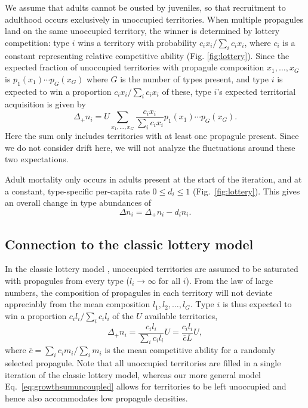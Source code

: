 \documentclass[12pt]{article}
\begin{document}
We assume that adults cannot be ousted by juveniles, so that recruitment to adulthood occurs exclusively in unoccupied territories. When multiple propagules land on the same unoccupied territory, the winner is determined by lottery competition: type $i$ wins a territory with probability $c_i x_i/\sum_i c_i x_i$, where $c_i$ is a constant representing relative competitive ability (Fig. \ref{fig:lottery}). Since the expected fraction of unoccupied territories with propagule composition $x_1,\ldots,x_G$ is $p_1(x_1)\cdots p_G(x_G)$ where $G$ is the number of types present, and type $i$ is expected to win a proportion $c_i x_i/\sum_i c_i x_i$ of these, type $i$'s expected territorial acquisition is given by
\begin{equation}
\Delta_+ n_i=U\sum_{x_1,\ldots,x_G} \frac{c_i x_i}{\sum_i c_i x_i} p_1(x_1)\cdots p_G(x_G). \label{eq:growthsumuncoupled}
\end{equation}
Here the sum only includes territories with at least one propagule present. Since we do not consider drift here, we will not analyze the fluctuations around these two expectations.

Adult mortality only occurs in adults present at the start of the  iteration, and at a constant, type-specific per-capita rate $0\leq d_i\leq 1$ (Fig.~\ref{fig:lottery}). This gives an overall change in type abundances of
\begin{equation}
\Delta n_i=\Delta_+ n_i-d_i n_i. \label{eq:delttot}
\end{equation}

\subsection*{Connection to the classic lottery model}

In the classic lottery model \citep{chesson_1981}, unoccupied territories are assumed to be saturated with propagules from every type ($l_i\rightarrow \infty$ for all $i$). From the law of large numbers, the composition of propagules in each territory will not deviate appreciably from the mean composition $l_1,l_2,\ldots,l_G$. Type $i$ is thus expected to win a proportion $c_i l_i/\sum_i c_i l_i$ of the $U$ available territories,
\begin{equation}
\Delta_+ n_i=\frac{c_i l_i}{\sum_i c_i l_i}U=\frac{c_i l_i}{\overline{c}L}U, \label{eq:lottery}
\end{equation}
where $\overline{c}=\sum_i c_i m_i/\sum_i m_i$ is the mean competitive ability for a randomly selected propagule. Note that all unoccupied territories are filled in a single iteration of the classic lottery model, whereas our more general model Eq.~\eqref{eq:growthsumuncoupled} allows for territories to be left unoccupied and hence also accommodates low propagule densities.
\end{document}
